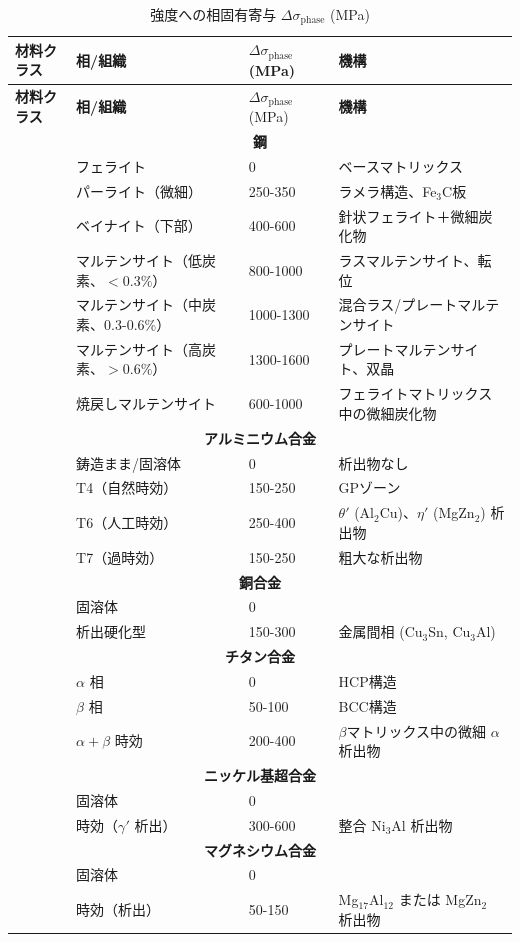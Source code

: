 \documentclass[12pt,a4paper]{article}
\begin{document}
	\begin{longtable}{p{3.5cm} p{3.0cm} p{3.0cm} p{4cm}}
		\caption{強度への相固有寄与 $\Delta\sigma_{\text{phase}}$ (MPa)}\label{tab:phase_contrib}\\
		\toprule
		\textbf{材料クラス} & \textbf{相/組織} & $\Delta\sigma_{\text{phase}}$ (MPa) & \textbf{機構} \\
		\midrule
		\endfirsthead
		\toprule
		\textbf{材料クラス} & \textbf{相/組織} & $\Delta\sigma_{\text{phase}}$ (MPa) & \textbf{機構} \\
		\midrule
		\endhead
		\multicolumn{4}{c}{\textbf{鋼}} \\
		& フェライト & 0 & ベースマトリックス \\
		& パーライト（微細） & 250-350 & ラメラ構造、Fe$_3$C板 \\
		& ベイナイト（下部） & 400-600 & 針状フェライト＋微細炭化物 \\
		& マルテンサイト（低炭素、$<0.3\%$） & 800-1000 & ラスマルテンサイト、転位 \\
		& マルテンサイト（中炭素、0.3-0.6\%） & 1000-1300 & 混合ラス/プレートマルテンサイト \\
		& マルテンサイト（高炭素、$>0.6\%$） & 1300-1600 & プレートマルテンサイト、双晶 \\
		& 焼戻しマルテンサイト & 600-1000 & フェライトマトリックス中の微細炭化物 \\
		\hline
		\multicolumn{4}{c}{\textbf{アルミニウム合金}} \\
		& 鋳造まま/固溶体 & 0 & 析出物なし \\
		& T4（自然時効） & 150-250 & GPゾーン \\
		& T6（人工時効） & 250-400 & $\theta'$ (Al$_2$Cu)、$\eta'$ (MgZn$_2$) 析出物 \\
		& T7（過時効） & 150-250 & 粗大な析出物 \\
		\hline
		\multicolumn{4}{c}{\textbf{銅合金}} \\
		& 固溶体 & 0 & \\
		& 析出硬化型 & 150-300 & 金属間相 (Cu$_3$Sn, Cu$_3$Al) \\
		\hline
		\multicolumn{4}{c}{\textbf{チタン合金}} \\
		& $\alpha$ 相 & 0 & HCP構造 \\
		& $\beta$ 相 & 50-100 & BCC構造 \\
		& $\alpha+\beta$ 時効 & 200-400 & $\beta$マトリックス中の微細 $\alpha$ 析出物 \\
		\hline
		\multicolumn{4}{c}{\textbf{ニッケル基超合金}} \\
		& 固溶体 & 0 & \\
		& 時効（$\gamma'$ 析出） & 300-600 & 整合 Ni$_3$Al 析出物 \\
		\hline
		\multicolumn{4}{c}{\textbf{マグネシウム合金}} \\
		& 固溶体 & 0 & \\
		& 時効（析出） & 50-150 & Mg$_{17}$Al$_{12}$ または MgZn$_2$ 析出物 \\
		\bottomrule
	\end{longtable}
	
\end{document}
